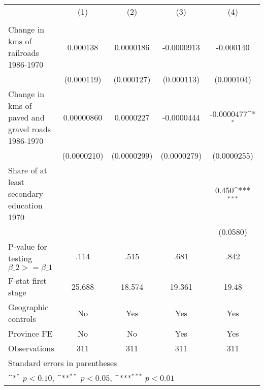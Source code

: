 {
\def\sym#1{\ifmmode^{#1}\else\(^{#1}\)\fi}
\begin{tabular}{l*{4}{c}}
\hline\hline
                &\multicolumn{1}{c}{(1)}&\multicolumn{1}{c}{(2)}&\multicolumn{1}{c}{(3)}&\multicolumn{1}{c}{(4)}\\
                &\multicolumn{1}{c}{}&\multicolumn{1}{c}{}&\multicolumn{1}{c}{}&\multicolumn{1}{c}{}\\
\hline
Change in kms of railroads 1986-1970& 0.000138         &0.0000186         &-0.0000913         &-0.000140         \\
                &(0.000119)         &(0.000127)         &(0.000113)         &(0.000104)         \\
[1em]
Change in kms of paved and gravel roads 1986-1970&0.00000860         &0.0000227         &-0.0000444         &-0.0000477\sym{*}  \\
                &(0.0000210)         &(0.0000299)         &(0.0000279)         &(0.0000255)         \\
[1em]
Share of at least secondary education 1970&                  &                  &                  &    0.450\sym{***}\\
                &                  &                  &                  & (0.0580)         \\
\hline
P-value for testing $\beta\_{2} >= \beta\_{1}$&     .114         &     .515         &     .681         &     .842         \\
F-stat first stage&   25.688         &   18.574         &   19.361         &    19.48         \\
Geographic controls&       No         &      Yes         &      Yes         &      Yes         \\
Province FE     &       No         &       No         &      Yes         &      Yes         \\
Observations    &      311         &      311         &      311         &      311         \\
\hline\hline
\multicolumn{5}{l}{\footnotesize Standard errors in parentheses}\\
\multicolumn{5}{l}{\footnotesize \sym{*} \(p<0.10\), \sym{**} \(p<0.05\), \sym{***} \(p<0.01\)}\\
\end{tabular}
}
